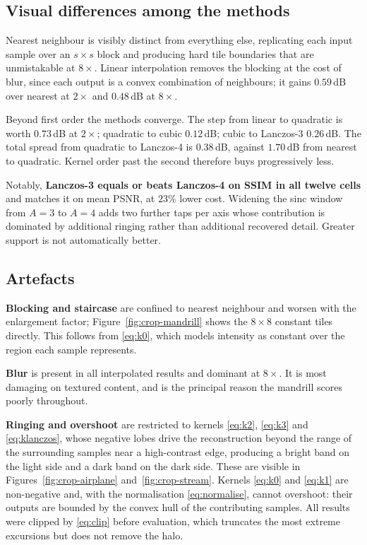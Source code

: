 \documentclass[11pt,a4paper]{article}
\begin{document}
\subsection{Visual differences among the methods}

Nearest neighbour is visibly distinct from everything else, replicating each input sample over
an $s \times s$ block and producing hard tile boundaries that are unmistakable at $8\times$.
Linear interpolation removes the blocking at the cost of blur, since each output is a convex
combination of neighbours; it gains $0.59$\,dB over nearest at $2\times$ and $0.48$\,dB at
$8\times$.

Beyond first order the methods converge. The step from linear to quadratic is worth
$0.73$\,dB at $2\times$; quadratic to cubic $0.12$\,dB; cubic to Lanczos-3 $0.26$\,dB. The
total spread from quadratic to Lanczos-4 is $0.38$\,dB, against $1.70$\,dB from nearest to
quadratic. Kernel order past the second therefore buys progressively less.

Notably, \textbf{Lanczos-3 equals or beats Lanczos-4 on SSIM in all twelve cells} and matches
it on mean PSNR, at $23\%$ lower cost. Widening the sinc window from $A=3$ to $A=4$ adds two
further taps per axis whose contribution is dominated by additional ringing rather than
additional recovered detail. Greater support is not automatically better.

\subsection{Artefacts}
\label{sec:artefacts}

\textbf{Blocking and staircase} are confined to nearest neighbour and worsen with the
enlargement factor; Figure~\ref{fig:crop-mandrill} shows the $8\times8$ constant tiles
directly. This follows from \eqref{eq:k0}, which models intensity as constant over the region
each sample represents.

\textbf{Blur} is present in all interpolated results and dominant at $8\times$. It is most
damaging on textured content, and is the principal reason the mandrill scores poorly
throughout.

\textbf{Ringing and overshoot} are restricted to kernels \eqref{eq:k2}, \eqref{eq:k3} and
\eqref{eq:klanczos}, whose negative lobes drive the reconstruction beyond the range of the
surrounding samples near a high-contrast edge, producing a bright band on the light side and a
dark band on the dark side. These are visible in Figures~\ref{fig:crop-airplane}
and~\ref{fig:crop-stream}. Kernels \eqref{eq:k0} and \eqref{eq:k1} are non-negative and, with
the normalisation \eqref{eq:normalise}, cannot overshoot: their outputs are bounded by the
convex hull of the contributing samples. All results were clipped by \eqref{eq:clip} before
evaluation, which truncates the most extreme excursions but does not remove the halo.
\end{document}
